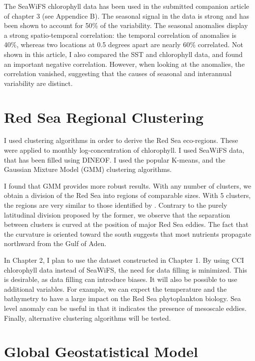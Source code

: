 The SeaWiFS chlorophyll data has been used in the submitted companion article
of chapter 3 (see Appendice B).  The seasonal signal in the data is strong and
has been shown to account for 50\% of the variability. The seasonal anomalies
display a strong spatio-temporal correlation: the temporal correlation of
anomalies is 40\%, whereas two locations at 0.5 degrees apart are nearly 60\%
correlated. Not shown in this article, I also compared the SST and chlorophyll
data, and found an important negative correlation. However, when looking at the
anomalies, the correlation vanished, suggesting that the causes of seasonal and
interannual variability are distinct.

\section{Red Sea Regional Clustering}

I used clustering algorithms in order to derive the Red Sea eco-regions. These
were applied to monthly log-concentration of chlorophyll. I used SeaWiFS data,
that has been filled using DINEOF. I used the popular K-means, and the Gaussian
Mixture Model (GMM) clustering algorithms.

I found that GMM provides more robust results. With any number of clusters, we
obtain a division of the Red Sea into regions of comparable sizes.  With 5
clusters, the regions are very similar to those identified by
\citet{Raitsos2013}.  Contrary to the purely latitudinal division proposed by
the former, we observe that the separation between clusters is curved at the
position of major Red Sea eddies.  The fact that the curvature is oriented
toward the south suggests that most nutrients propagate northward from the Gulf
of Aden.

In Chapter 2, I plan to use the dataset constructed in Chapter 1.  By using CCI
chlorophyll data instead of SeaWiFS, the need for data filling is minimized.
This is desirable, as data filling can introduce biases. It will also be
possible to use additional variables. For example, we can expect the
temperature and the bathymetry to have a large impact on the Red Sea
phytoplankton biology. Sea level anomaly can be useful in that it indicates the
presence of mesoscale eddies. Finally, alternative clustering algorithms will
be tested.

\section{Global Geostatistical Model}


